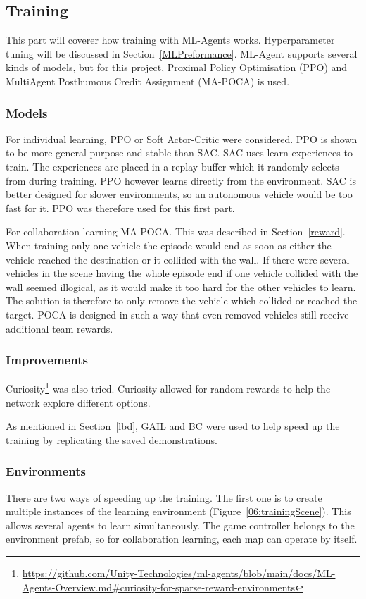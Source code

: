 \subsection{Training}
This part will coverer how training with ML-Agents works. Hyperparameter tuning will be discussed in Section~\ref{MLPreformance}. ML-Agent supports several kinds of models, but for this project, Proximal Policy Optimisation (PPO) and MultiAgent Posthumous Credit Assignment (MA-POCA) is used\cite{MLagentsoverview}.  

\subsubsection{Models}
For individual learning, PPO or Soft Actor-Critic were considered. PPO is shown to be more general-purpose and stable than SAC\cite{FoersterNFTKW17}. SAC uses learn experiences to train. The experiences are placed in a replay buffer which it randomly selects from during training. PPO however learns directly from the environment. SAC is better designed for slower environments, so an autonomous vehicle would be too fast for it. PPO was therefore used for this first part. 

For collaboration learning MA-POCA. This was described in Section~\ref{reward}. When training only one vehicle the episode would end as soon as either the vehicle reached the destination or it collided with the wall. If there were several vehicles in the scene having the whole episode end if one vehicle collided with the wall seemed illogical, as it would make it too hard for the other vehicles to learn. The solution is therefore to only remove the vehicle which collided or reached the target. POCA is designed in such a way that even removed vehicles still receive additional team rewards.   

\subsubsection{Improvements}
Curiosity\footnote{\url{https://github.com/Unity-Technologies/ml-agents/blob/main/docs/ML-Agents-Overview.md#curiosity-for-sparse-reward-environments}} was also tried. Curiosity allowed for random rewards to help the network explore different options.

As mentioned in Section~\ref{lbd}, GAIL and BC were used to help speed up the training by replicating the saved demonstrations. 

\subsubsection{Environments}
There are two ways of speeding up the training. The first one is to create multiple instances of the learning environment (Figure~\ref{06:trainingScene}). This allows several agents to learn simultaneously. The game controller belongs to the environment prefab, so for collaboration learning, each map can operate by itself.  

